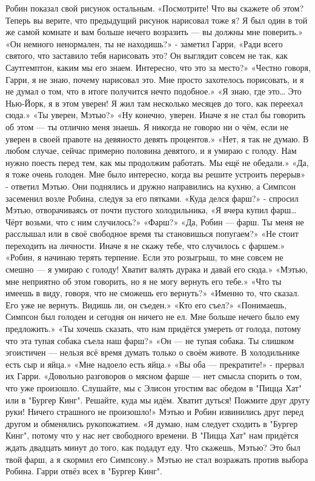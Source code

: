 \documentclass[a4paper,12pt]{book}
\begin{document}
	Робин показал свой рисунок остальным.
	«Посмотрите! Что вы скажете об этом? Теперь вы верите, что предыдущий рисунок нарисовал тоже я? Я был один в той же самой комнате и вам больше нечего возразить — вы должны мне поверить.»
	«Он немного ненормален, ты не находишь?» - заметил Гарри,
	«Ради всего святого, что заставило тебя нарисовать это? Он выглядит совсем не так, как Саутгемптон, каким мы его знаем. Интересно, что это за место?»
	«Честно говоря, Гарри, я не знаю, почему нарисовал это. Мне просто захотелось порисовать, и я не думал о том, что в итоге получится нечто подобное.»
	«Я знаю, где это… Это Нью-Йорк, я в этом уверен! Я жил там несколько месяцев до того, как переехал сюда.»
	«Ты уверен, Мэтью?»
	«Ну конечно, уверен. Иначе я не стал бы говорить об этом — ты отлично меня знаешь. Я никогда не говорю ни о чём, если не уверен в своей правоте на девяносто девять процентов.»
	«Нет, я так не думаю. В любом случае, сейчас примерно половина девятого, и я умираю с голоду. Нам нужно поесть перед тем, как мы продолжим работать. Мы ещё не обедали.»
	«Да, я тоже очень голоден. Мне было интересно, когда вы решите устроить перерыв» - ответил Мэтью. Они поднялись и дружно направились на кухню, а Симпсон засеменил возле Робина, следуя за его пятками.
	«Куда делся фарш?» - спросил Мэтью, отворачиваясь от почти пустого холодильника,
	«Я вчера купил фарш… Чёрт возьми, что с ним случилось?»
	«Фарш?»
	«Да, Робин — фарш. Ты меня не расслышал или в своё свободное время ты становишься попугаем?»
	«Не стоит переходить на личности. Иначе я не скажу тебе, что случилось с фаршем.»
	«Робин, я начинаю терять терпение. Если это розыгрыш, то мне совсем не смешно — я умираю с голоду! Хватит валять дурака и давай его сюда.»
	«Мэтью, мне неприятно об этом говорить, но я не могу вернуть его тебе.»
	«Что ты имеешь в виду, говоря, что не сможешь его вернуть?»
	«Именно то, что сказал. Его уже не вернуть. Видишь ли, он съеден.»
	«Кто его съел?»
	«Понимаешь, Симпсон был голоден и сегодня он ничего не ел. Мне больше нечего было ему предложить.»
	«Ты хочешь сказать, что нам придётся умереть от голода, потому что эта тупая собака съела наш фарш?»
	«Он — не тупая собака. Ты слишком эгоистичен — нельзя всё время думать только о своём животе. В холодильнике есть сыр и яйца.»
	«Мне надоело есть яйца.»
	«Вы оба — прекратите!» - прервал их Гарри.
	«Довольно разговоров о мясном фарше — нет смысла спорить о том, что уже произошло. Слушайте, мы с Элисон угостим вас обедом в "Пицца Хат" или в "Бургер Кинг". Решайте, куда мы идём. Хватит дуться! Пожмите друг другу руки! Ничего страшного не произошло!»
	Мэтью и Робин извинились друг перед другом и обменялись рукопожатием.
	«Я думаю, нам следует сходить в "Бургер Кинг", потому что у нас нет свободного времени. В "Пицца Хат" нам придётся ждать двадцать минут до того, как подадут еду. Что скажешь, Мэтью? Это был твой фарш, а я скормил его Симпсону.»
	Мэтью не стал возражать против выбора Робина.
	Гарри отвёз всех в "Бургер Кинг".
	
\end{document}
